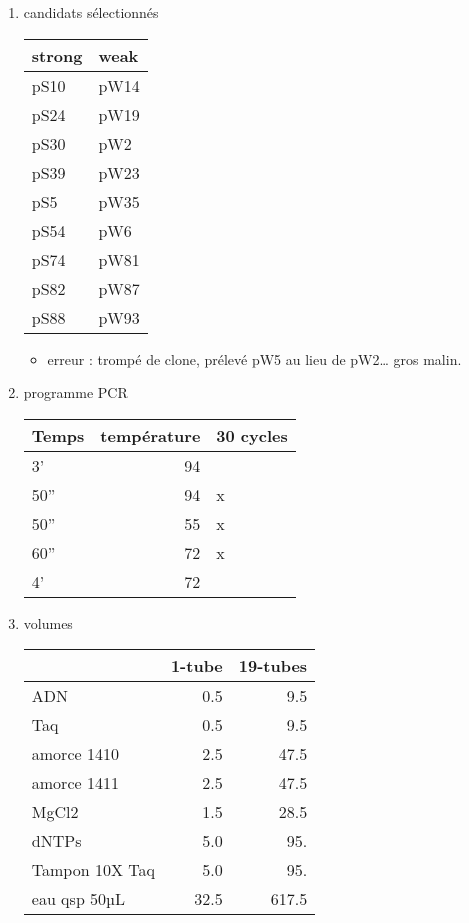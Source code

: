 \documentclass[9pt, oneside, twocolumn]{scrartcl}
\begin{document}
\begin{enumerate}
\item candidats sélectionnés
\label{sec:orgheadline19}
\begin{center}
\begin{tabular}{ll}
\toprule
strong & weak\\
\midrule
pS10 & pW14\\
pS24 & pW19\\
pS30 & pW2\\
pS39 & pW23\\
pS5 & pW35\\
pS54 & pW6\\
pS74 & pW81\\
pS82 & pW87\\
pS88 & pW93\\
\bottomrule
\end{tabular}
\end{center}

\begin{itemize}
\item erreur : trompé de clone, prélevé pW5 au lieu de pW2… gros malin.
\end{itemize}

\item programme PCR
\label{sec:orgheadline20}
\begin{center}
\begin{tabular}{lrl}
\toprule
Temps & température & 30 cycles\\
\midrule
3' & 94 & \\
50'' & 94 & x\\
50'' & 55 & x\\
60'' & 72 & x\\
4' & 72 & \\
\bottomrule
\end{tabular}
\end{center}

\item volumes
\label{sec:orgheadline21}
\begin{center}
\begin{tabular}{lrr}
\toprule
 & 1-tube & 19-tubes\\
\midrule
ADN & 0.5 & 9.5\\
Taq & 0.5 & 9.5\\
amorce 1410 & 2.5 & 47.5\\
amorce 1411 & 2.5 & 47.5\\
MgCl2 & 1.5 & 28.5\\
dNTPs & 5.0 & 95.\\
Tampon 10X Taq & 5.0 & 95.\\
\midrule
eau qsp 50µL & 32.5 & 617.5\\
\bottomrule
\end{tabular}
\end{center}


\end{enumerate}
\end{document}
